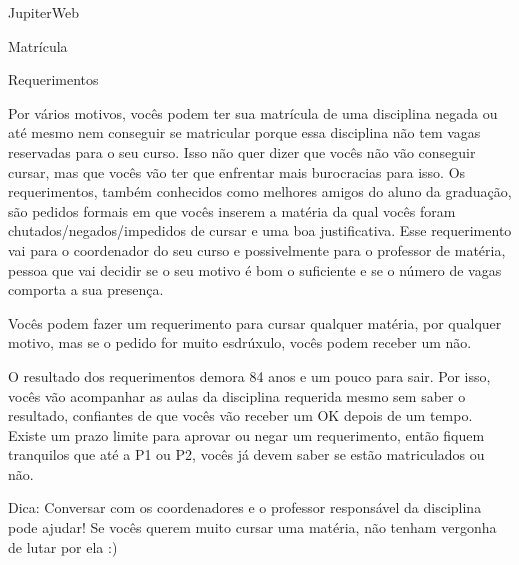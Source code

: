 \begin{secao}{JupiterWeb}
\begin{subsecao}{Matrícula}
\end{subsecao}
\pagebreak
\begin{subsecao}{Requerimentos}

Por vários motivos, vocês podem ter sua matrícula de uma disciplina negada ou
até mesmo nem conseguir se matricular porque essa disciplina não tem vagas
reservadas para o seu curso. Isso não quer dizer que vocês não vão conseguir
cursar, mas que vocês vão ter que enfrentar mais burocracias para isso. Os
requerimentos, também conhecidos como melhores amigos do aluno da graduação,
são pedidos formais em que vocês inserem a matéria da qual vocês foram
chutados/negados/impedidos de cursar e uma boa justificativa. Esse requerimento
vai para o coordenador do seu curso e possivelmente para o professor de
matéria, pessoa que vai decidir se o seu motivo é bom o suficiente e se o
número de vagas comporta a sua presença.

Vocês podem fazer um requerimento para cursar qualquer matéria, por qualquer
motivo, mas se o pedido for muito esdrúxulo, vocês podem receber um não.

O resultado dos requerimentos demora 84 anos e um pouco para sair. Por isso,
vocês vão acompanhar as aulas da disciplina requerida mesmo sem saber o
resultado, confiantes de que vocês vão receber um OK depois de um tempo. Existe
um prazo limite para aprovar ou negar um requerimento, então fiquem tranquilos
que até a P1 ou P2, vocês já devem saber se estão matriculados ou não.

Dica: Conversar com os coordenadores e o professor responsável da disciplina
pode ajudar! Se vocês querem muito cursar uma matéria, não tenham vergonha de
lutar por ela :)

\end{subsecao}

\end{secao}
